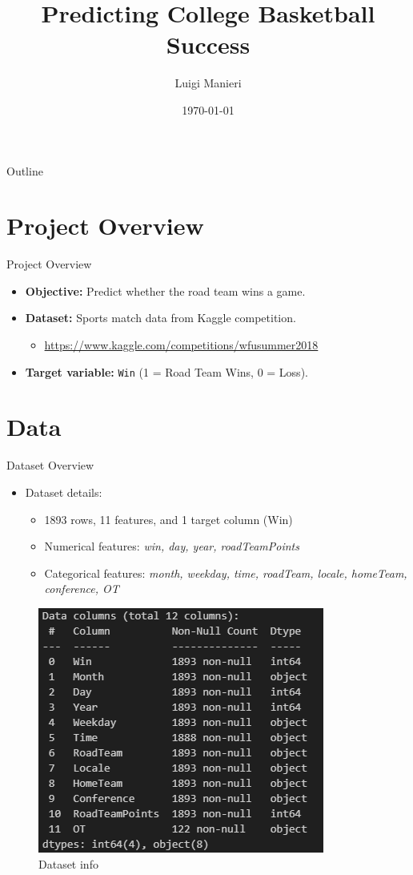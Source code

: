 \documentclass{beamer}
\title{\textbf{Predicting College Basketball Success}}
\author{Luigi Manieri}
\institute{Alma Mater Studiorum Bologna}
\date{\today}
\begin{document}
\begin{frame}
    \titlepage
\end{frame}

\begin{frame}{Outline}
    \tableofcontents
\end{frame}

\section{Project Overview}
\begin{frame}{Project Overview}
  \begin{itemize}
    \item \textbf{Objective:} Predict whether the road team wins a game.
    \item \textbf{Dataset:} Sports match data from Kaggle competition.
    \begin{itemize}
        \item \href{https://www.kaggle.com/competitions/wfusummer2018}{https://www.kaggle.com/competitions/wfusummer2018}
    \end{itemize}
    \item \textbf{Target variable:} \texttt{Win} (1 = Road Team Wins, 0 = Loss).
  \end{itemize}
\end{frame}

\section{Data}
\begin{frame}{Dataset Overview}
\begin{itemize}
    \item Dataset details:
        \begin{itemize}
            \item 1893 rows, 11 features, and 1 target column (Win)
            \item Numerical features: \textit{win, day, year, roadTeamPoints}
            \item Categorical features: \textit{month, weekday, time, roadTeam, locale, homeTeam, conference, OT}
        \end{itemize}
    \end{itemize}
        \begin{figure}
            \centering
            \includegraphics[width=0.35\linewidth]{images/dataset_columns.png}
            \caption{Dataset info}
            \label{fig:enter-label}
        \end{figure}
\end{frame}
\end{document}
